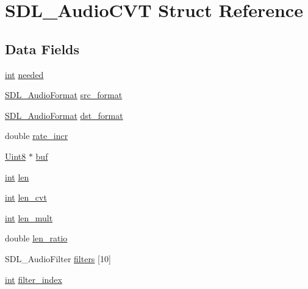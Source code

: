 \hypertarget{struct_s_d_l___audio_c_v_t}{}\section{S\+D\+L\+\_\+\+Audio\+C\+VT Struct Reference}
\label{struct_s_d_l___audio_c_v_t}
\subsection*{Data Fields}
\begin{DoxyCompactItemize}
\item 
\hyperlink{_s_d_l__thread_8h_a6a64f9be4433e4de6e2f2f548cf3c08e}{int} \hyperlink{struct_s_d_l___audio_c_v_t_abaf982c31b3b8169de1fa31a5d139042}{needed}
\item 
\hyperlink{_s_d_l__audio_8h_a491ed103fd25d920c4e6b7495217ce66}{S\+D\+L\+\_\+\+Audio\+Format} \hyperlink{struct_s_d_l___audio_c_v_t_a7ba62bb8fb82944259397ba96b6ce3ec}{src\+\_\+format}
\item 
\hyperlink{_s_d_l__audio_8h_a491ed103fd25d920c4e6b7495217ce66}{S\+D\+L\+\_\+\+Audio\+Format} \hyperlink{struct_s_d_l___audio_c_v_t_abdec9414a002259c6c41b7805a8923f0}{dst\+\_\+format}
\item 
double \hyperlink{struct_s_d_l___audio_c_v_t_aa84e79f31da7eaa8715492a7655fc12e}{rate\+\_\+incr}
\item 
\hyperlink{_s_d_l__stdinc_8h_a2944638813a090aa23e62f4da842c3e2}{Uint8} $\ast$ \hyperlink{struct_s_d_l___audio_c_v_t_ab9daf3b7604bbd1d7c1c1a5cabcc4076}{buf}
\item 
\hyperlink{_s_d_l__thread_8h_a6a64f9be4433e4de6e2f2f548cf3c08e}{int} \hyperlink{struct_s_d_l___audio_c_v_t_afed088663f8704004425cdae2120b9b3}{len}
\item 
\hyperlink{_s_d_l__thread_8h_a6a64f9be4433e4de6e2f2f548cf3c08e}{int} \hyperlink{struct_s_d_l___audio_c_v_t_a910aafa3300093c830283c41ffe5330a}{len\+\_\+cvt}
\item 
\hyperlink{_s_d_l__thread_8h_a6a64f9be4433e4de6e2f2f548cf3c08e}{int} \hyperlink{struct_s_d_l___audio_c_v_t_a587a24438864be243d1055fe69afb868}{len\+\_\+mult}
\item 
double \hyperlink{struct_s_d_l___audio_c_v_t_a097550d719b815904ba0526388c0c53c}{len\+\_\+ratio}
\item 
S\+D\+L\+\_\+\+Audio\+Filter \hyperlink{struct_s_d_l___audio_c_v_t_a4364c9355efb051007aee950a80228e1}{filters} \mbox{[}10\mbox{]}
\item 
\hyperlink{_s_d_l__thread_8h_a6a64f9be4433e4de6e2f2f548cf3c08e}{int} \hyperlink{struct_s_d_l___audio_c_v_t_a73505da97e18bba197af82c4d3cf1005}{filter\+\_\+index}
\end{DoxyCompactItemize}


